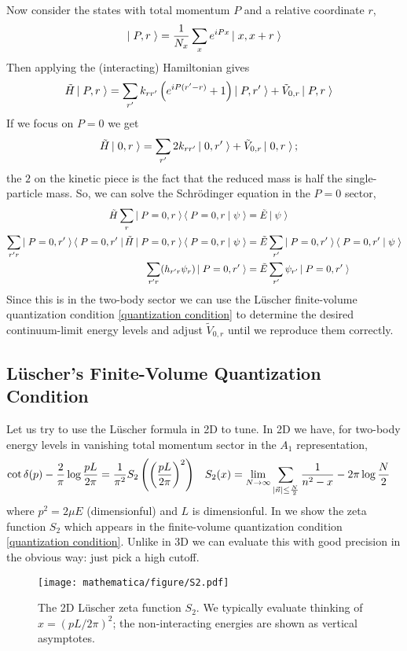 Now consider the states with total momentum $P$ and a relative coordinate $r$,
\begin{align}
    \left|\;P,r\;\right\rangle = \frac{1}{N_x} \sum_x e^{iPx} \left|\;x,x+r\;\right\rangle
\end{align}
Then applying the (interacting) Hamiltonian gives
\begin{align}
    \tilde{H} \left|\;P,r\;\right\rangle
    &=
            \sum_{r'} k_{rr'} \left( e^{iP(r'-r)}+1\right)\left|\;P,r'\;\right\rangle
        +   \tilde{V}_{0,r} \left|\;P,r\;\right\rangle
\end{align}
If we focus on $P=0$ we get
\begin{align}
    \tilde{H} \left|\;0,r\;\right\rangle
    &=
            \sum_{r'} 2k_{rr'} \left|\;0,r'\;\right\rangle
        +   \tilde{V}_{0,r} \left|\;0,r\;\right\rangle;
\end{align}
the $2$ on the kinetic piece is the fact that the reduced mass is half the single-particle mass.
So, we can solve the Schr\"{o}dinger equation in the $P=0$ sector,
\begin{align}
    \tilde{H} \sum_r \left|\;P=0,r\;\right\rangle\left\langle\;P=0,r\;\middle|\;\psi\;\right\rangle &= \tilde{E}\left|\;\psi\;\right\rangle
    \\
    \sum_{r'r} \left|\;P=0, r'\;\right\rangle \left\langle\;P=0, r'\;\right| \tilde{H} \left|\;P=0,r\;\right\rangle\left\langle\;P=0,r\;\middle|\;\psi\;\right\rangle &= \tilde{E} \sum_{r'} \left|\;P=0, r'\;\right\rangle\left\langle\;P=0,r'\;\middle|\;\psi\;\right\rangle
    \\
    \sum_{r'r} (h_{r'r} \psi_r) \left|\;P=0, r'\;\right\rangle &= \tilde{E} \sum_{r'} \psi_{r'} \left|\;P=0, r'\;\right\rangle
    \label{eq:two-body schrodinger equation}
\end{align}
Since this is in the two-body sector we can use the L\"{u}scher finite-volume quantization condition \eqref{quantization condition} to determine the desired continuum-limit energy levels and adjust $\tilde{V}_{0,r}$ until we reproduce them correctly.

\subsection{L\"{u}scher's Finite-Volume Quantization Condition}

Let us try to use the L\"{u}scher formula in 2D to tune.
In 2D we have, for two-body energy levels in vanishing total momentum sector in the $A_1$ representation,
\begin{align}
	\cot \delta(p) - \frac{2}{\pi} \log \frac{pL}{2\pi} &= \frac{1}{\pi^2} S_2\left(\left(\frac{pL}{2\pi}\right)^2\right)
	&	
	S_2(x) &= \lim_{N\rightarrow\infty} \sum_{\left| \vec{n} \right| \leq \frac{N}{2}} \frac{1}{n^2-x} - 2\pi \log \frac{N}{2}
	\label{eq:quantization condition}
\end{align}
where $p^2=2\mu E$ (dimensionful) and $L$ is dimensionful.
In  we show the zeta function $S_2$ which appears in the finite-volume quantization condition \eqref{quantization condition}.
Unlike in 3D we can evaluate this with good precision in the obvious way: just pick a high cutoff.
\begin{figure}
	\texttt{[image: mathematica/figure/S2.pdf]}
	\caption{The 2D L\"{u}scher zeta function $S_2$.  We typically evaluate thinking of $x = (pL/2\pi)^2$; the non-interacting energies are shown as vertical asymptotes.}
	\label{fig:S2}
\end{figure}

